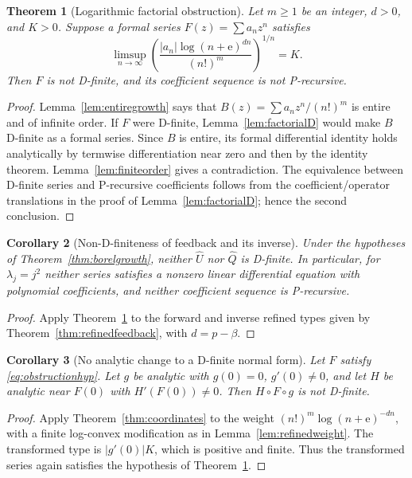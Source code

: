 \documentclass[11pt,a4paper]{article}
\numberwithin{equation}{section}
\newtheorem{theorem}{Theorem}[section]
\newtheorem{corollary}[theorem]{Corollary}
\theoremstyle{definition}
\theoremstyle{remark}
\newcommand{\ee}{\mathrm e}
\newcommand{\Q}{\widehat Q}
\newcommand{\U}{\widehat U}
\begin{document}
\begin{theorem}[Logarithmic factorial obstruction]
\label{thm:obstruction}
Let $m\ge1$ be an integer, $d>0$, and $K>0$. Suppose a formal series
$F(z)=\sum a_nz^n$ satisfies
\begin{equation}
 \limsup_{n\to\infty}
 \left(\frac{|a_n|\log(n+\ee)^{dn}}{(n!)^m}\right)^{1/n}=K.
 \label{eq:obstructionhyp}
\end{equation}
Then $F$ is not D-finite, and its coefficient sequence is not
P-recursive.
\end{theorem}
\begin{proof}
Lemma~\ref{lem:entiregrowth} says that
$B(z)=\sum a_nz^n/(n!)^m$ is entire and of infinite order. If $F$
were D-finite, Lemma~\ref{lem:factorialD} would make $B$ D-finite as
a formal series. Since $B$ is entire, its formal differential identity
holds analytically by termwise differentiation near zero and then by
the identity theorem. Lemma~\ref{lem:finiteorder} gives a contradiction.
The equivalence between D-finite series and P-recursive coefficients
follows from the coefficient/operator translations in the proof of
Lemma~\ref{lem:factorialD}; hence the second conclusion.
\end{proof}

\begin{corollary}[Non-D-finiteness of feedback and its inverse]
\label{cor:nondfinite}
Under the hypotheses of Theorem~\ref{thm:borelgrowth}, neither $\U$
nor $\Q$ is D-finite. In particular, for $\lambda_j=j^2$ neither
series satisfies a nonzero linear differential equation with polynomial
coefficients, and neither coefficient sequence is P-recursive.
\end{corollary}
\begin{proof}
Apply Theorem~\ref{thm:obstruction} to the forward and inverse refined
types given by Theorem~\ref{thm:refinedfeedback}, with $d=p-\beta$.
\end{proof}

\begin{corollary}[No analytic change to a D-finite normal form]
\label{cor:normalform}
Let $F$ satisfy \eqref{eq:obstructionhyp}. Let $g$ be analytic with
$g(0)=0$, $g'(0)\ne0$, and let $H$ be analytic near $F(0)$ with
$H'(F(0))\ne0$. Then $H\circ F\circ g$ is not D-finite.
\end{corollary}
\begin{proof}
Apply Theorem~\ref{thm:coordinates} to the weight
$(n!)^m\log(n+\ee)^{-dn}$, with a finite log-convex modification as
in Lemma~\ref{lem:refinedweight}. The transformed type is
$|g'(0)|K$, which is positive and finite. Thus the transformed series
again satisfies the hypothesis of Theorem~\ref{thm:obstruction}.
\end{proof}
\end{document}
